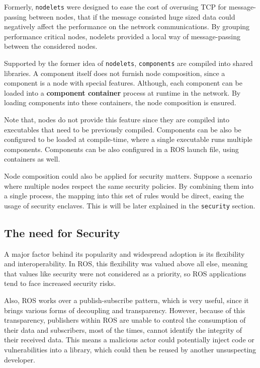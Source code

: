Formerly, \texttt{nodelets} were designed to ease the cost of overusing TCP for message-passing between nodes, that if the message consisted huge sized data could negatively affect the performance on the network communications. By grouping performance critical nodes, nodelets provided a local way of message-passing between the considered nodes.

Supported by the former idea of \texttt{nodelets}, \texttt{components} are compiled into shared libraries. A component itself does not furnish node composition, since a component is a node with special features. Although,  each component can be loaded into a \textbf{component container} process at runtime in the network. By loading components into these containers, the node composition is ensured. 
 
Note that, nodes do not provide this feature since they are compiled into executables that need to be previously compiled. Components can be also be configured to be loaded at compile-time, where a single executable runs multiple components. Components can be also configured in a ROS launch file, using containers as well.
 
Node composition could also be applied for security matters. Suppose a scenario where multiple nodes respect the same security policies. By combining them into a single process, the mapping into this set of rules would be direct, easing the usage of security enclaves. %
This is will be later explained in the \texttt{security} section.
               

\subsection{The need for Security}
        
A major factor behind its popularity and widespread adoption is its flexibility and interoperability. In ROS, this flexibility was valued above all else, meaning that values like security were not considered as a priority, so ROS applications tend to face increased security risks. 
            
Also, ROS works over a publish-subscribe pattern, which is very useful, since it brings various forms of decoupling and transparency. However, because of this transparency, publishers within ROS are unable to control the consumption of their data and subscribers, most of the times, cannot identify the integrity of their received data. %
This means a malicious actor could potentially inject code or vulnerabilities into a library, which could then be reused by another unsuspecting developer.

